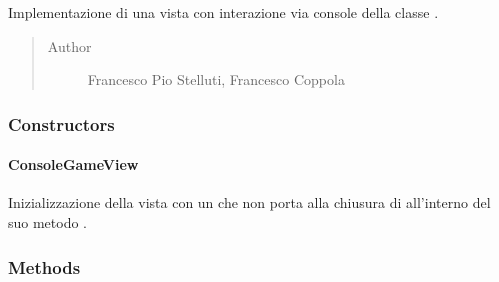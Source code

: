 \documentclass[letterpaper,10pt,italian,openany,oneside]{sphinxmanual}
\begin{document}
\begin{fulllineitems}
\label{\detokenize{source/it/unicam/cs/pa/mastermind/ui/ConsoleGameView:it.unicam.cs.pa.mastermind.ui.ConsoleGameView}}
Implementazione di una vista con interazione via console della classe .
\begin{quote}\begin{description}
\item[{Author}] \leavevmode
Francesco Pio Stelluti, Francesco Coppola

\end{description}\end{quote}

\end{fulllineitems}



\subsubsection{Constructors}
\label{\detokenize{source/it/unicam/cs/pa/mastermind/ui/ConsoleGameView:constructors}}

\paragraph{ConsoleGameView}
\label{\detokenize{source/it/unicam/cs/pa/mastermind/ui/ConsoleGameView:id1}}

\begin{fulllineitems}
\label{\detokenize{source/it/unicam/cs/pa/mastermind/ui/ConsoleGameView:it.unicam.cs.pa.mastermind.ui.ConsoleGameView.ConsoleGameView()}}
Inizializzazione della vista con un  che non porta alla chiusura di  all’interno del suo metodo .

\end{fulllineitems}



\subsubsection{Methods}
\label{\detokenize{source/it/unicam/cs/pa/mastermind/ui/ConsoleGameView:methods}}
\end{document}
